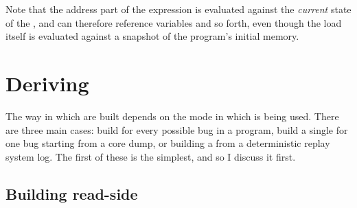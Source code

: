\begin{itemize}
  Note that the address part of the expression is evaluated against
  the \emph{current} state of the {\StateMachine}, and can therefore
  reference {\StateMachine} variables and so forth, even though the
  load itself is evaluated against a snapshot of the program's initial
  memory.
\end{itemize}


\section{Deriving \StateMachines}


The way in which {\StateMachines} are built depends on the mode in
which {\technique} is being used.  There are three main cases: build
\StateMachines{} for every possible bug in a program, build a single
\StateMachine{} for one bug starting from a core dump, or building a
\StateMachine{} from a deterministic replay system log.  The first of
these is the simplest, and so I discuss it first.

\subsection{Building read-side \StateMachines}

